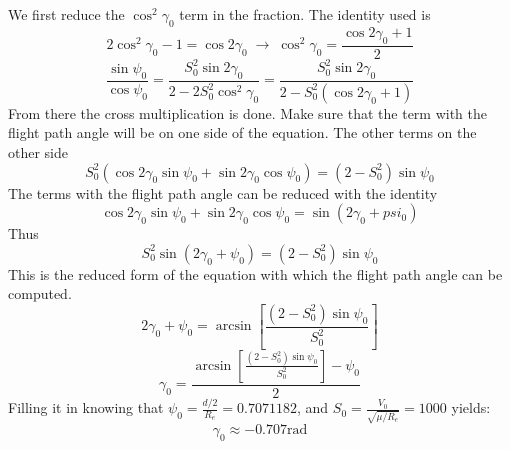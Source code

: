 We first reduce the $\cos^2\gamma_0$ term in the fraction. The identity used is 
\begin{equation}
2\cos^2\gamma_0-1=\cos2\gamma_0\;\rightarrow\;\cos^2\gamma_0 = \frac{\cos2\gamma_0+1}{2}
\end{equation}
\begin{equation}
\frac{\sin\psi_0}{\cos\psi_0}=\frac{S_0^2\sin2\gamma_0}{2-2S_0^2\cos^2\gamma_0}=\frac{S_0^2\sin2\gamma_0}{2-S_0^2(\cos2\gamma_0+1)}
\end{equation}
From there the cross multiplication is done. Make sure that the term with the flight path angle will be on one side of the equation. The other terms on the other side
\begin{equation}
S_0^2(\cos2\gamma_0\sin\psi_0+\sin2\gamma_0\cos\psi_0)=(2-S_0^2)\sin\psi_0
\end{equation}
The terms with the flight path angle can be reduced with the identity
\begin{equation}
\cos2\gamma_0\sin\psi_0+\sin2\gamma_0\cos\psi_0=\sin(2\gamma_0+psi_0)
\end{equation}
Thus
\begin{equation}
S_0^2\sin(2\gamma_0+\psi_0)=(2-S_0^2)\sin\psi_0
\end{equation}
This is the reduced form of the equation with which the flight path angle can be computed. 
\begin{equation}
2\gamma_0+\psi_0 = \arcsin[\frac{(2-S_0^2)\sin\psi_0}{S_0^2}]
\end{equation}
\begin{equation}
\gamma_0 = \frac{\arcsin[\frac{(2-S_0^2)\sin\psi_0}{S_0^2}]-\psi_0}{2}
\end{equation}
Filling it in knowing that $\psi_0 =\frac{d/2}{R_e}=0.7071182 $, and $S_0 = \frac{V_0}{\sqrt{\mu/R_e}}=1000$ yields:
\begin{equation}
\gamma_0 \approx  -0.707 \text{rad}
\end{equation}

